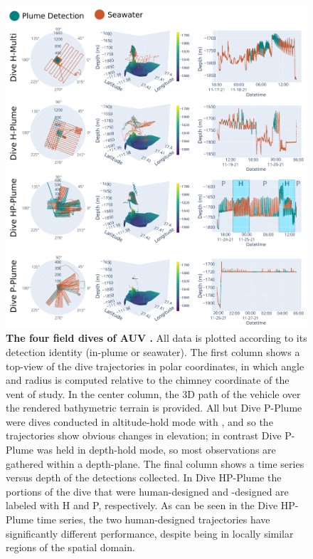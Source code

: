 \begin{figure}[h!]
    \centering
    \includegraphics[width=0.85\linewidth]{figures/detections_data.png}
    \caption[The four field dives of AUV \Sentry.]{\textbf{The four field dives of AUV \Sentry.} All data is plotted according to its detection identity (in-plume or seawater). The first column shows a top-view of the dive trajectories in polar coordinates, in which angle and radius is computed relative to the chimney coordinate of the vent of study. In the center column, the 3D path of the vehicle over the rendered bathymetric terrain is provided. All but Dive P-Plume were dives conducted in altitude-hold mode with \Sentry, and so the trajectories show obvious changes in elevation; in contrast Dive P-Plume was held in depth-hold mode, so most observations are gathered within a depth-plane. The final column shows a time series versus depth of the detections collected. In Dive HP-Plume the portions of the dive that were human-designed and \PHORTEX-designed are labeled with H and P, respectively. As can be seen in the Dive HP-Plume time series, the two human-designed trajectories have significantly different performance, despite being in locally similar regions of the spatial domain. }
    \label{fig:field_results}
\end{figure}

